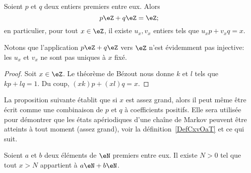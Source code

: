 \begin{corollary}       \label{CorgEMtLj}
    Soient \( p\) et \( q\) deux entiers premiers entre eux. Alors
    \begin{equation}
        p\eZ+q\eZ=\eZ;
    \end{equation}
    en particulier, pour tout \( x \in \eZ \), il existe \( u_x, v_x \) entiers tels que \(u_x p + v_x q = x \).
\end{corollary}

Notons que l'application \( p\eZ+q\eZ\) vers \( \eZ\) n'est évidemment pas injective: les $u_x$ et $v_x$ ne sont pas uniques à $x$ fixé.

\begin{proof}
    Soit \( x\in \eZ\). Le théorème de Bézout nous donne \( k\) et \( l\) tels que \( kp+lq=1\). Du coup, \( (xk)p+(xl)q=x\).
\end{proof}

La proposition suivante établit que si \( x\) est assez grand, alors il peut même être écrit comme une combinaison de \( p\) et \( q\) à coefficients positifs. Elle sera utilisée pour démontrer que les états apériodiques d'une chaîne de Markov peuvent être atteints à tout moment (assez grand), voir la définition~\ref{DefCxvOaT} et ce qui suit.

\begin{proposition}     \label{PropLAbRSE}
    Soient \( a\) et \( b\) deux éléments de \( \eN\) premiers entre eux. Il existe \( N>0\) tel que tout \( x>N\) appartient à \( a\eN+b\eN\).
\end{proposition}


